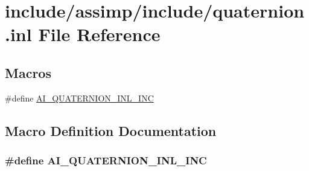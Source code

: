 \hypertarget{quaternion_8inl}{\section{include/assimp/include/quaternion.inl File Reference}
\label{quaternion_8inl}
}
\subsection*{Macros}
\begin{DoxyCompactItemize}
\item 
\#define \hyperlink{quaternion_8inl_a212808dfb687dd8e2f4c5d16a097d08e}{A\-I\-\_\-\-Q\-U\-A\-T\-E\-R\-N\-I\-O\-N\-\_\-\-I\-N\-L\-\_\-\-I\-N\-C}
\end{DoxyCompactItemize}


\subsection{Macro Definition Documentation}
\hypertarget{quaternion_8inl_a212808dfb687dd8e2f4c5d16a097d08e}{
\subsubsection[{A\-I\-\_\-\-Q\-U\-A\-T\-E\-R\-N\-I\-O\-N\-\_\-\-I\-N\-L\-\_\-\-I\-N\-C}]{\setlength{\rightskip}{0pt plus 5cm}\#define A\-I\-\_\-\-Q\-U\-A\-T\-E\-R\-N\-I\-O\-N\-\_\-\-I\-N\-L\-\_\-\-I\-N\-C}}\label{quaternion_8inl_a212808dfb687dd8e2f4c5d16a097d08e}
